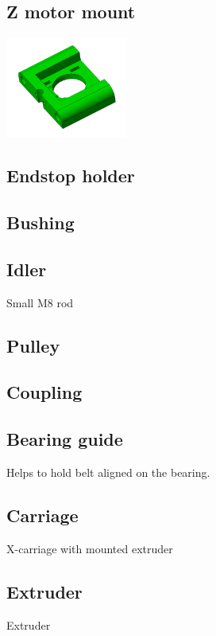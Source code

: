 \documentclass[11pt]{article}
\begin{document}
\hypertarget{thing_z-motor-mount}{\subsection{Z motor mount}}
\includegraphics[width=4cm]{images/z-motor-mount.jpg}

\hypertarget{thing_endstop-holder}{\subsection{Endstop holder}}

\hypertarget{thing_bushing}{\subsection{Bushing}}

\hypertarget{thing_idler-m8-piece}{\subsection{Idler}}
Small M8 rod

\hypertarget{thing_pulley}{\subsection{Pulley}}

\hypertarget{thing_coupling}{\subsection{Coupling}}

\hypertarget{thing_bearing-guide}{\subsection{Bearing guide}}
Helps to hold belt aligned on the bearing.

\hypertarget{thing_carriage}{\subsection{Carriage}}
X-carriage with mounted extruder

\hypertarget{thing_extruder}{\subsection{Extruder}}
Extruder
\end{document}

